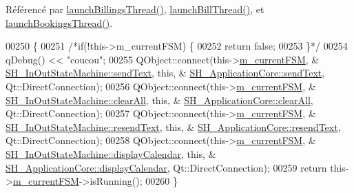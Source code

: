 Référencé par \hyperlink{classSH__ApplicationCore_a30738281acefd721fe9d06db46dcf123}{launch\-Billings\-Thread()}, \hyperlink{classSH__ApplicationCore_a17a048025bc51a96663029e58c722741}{launch\-Bill\-Thread()}, et \hyperlink{classSH__ApplicationCore_a193a9132da92b5e7a450e9307b657893}{launch\-Bookings\-Thread()}.


\begin{DoxyCode}
00250 \{
00251     \textcolor{comment}{/*if(!this->m\_currentFSM) \{}
00252 \textcolor{comment}{        return false;}
00253 \textcolor{comment}{    \}*/}
00254     qDebug() << \textcolor{stringliteral}{"coucou"};
00255     QObject::connect(this->\hyperlink{classSH__ApplicationCore_a1088f3ba13abb8b3989cc0c325524232}{m\_currentFSM}, &
      \hyperlink{classSH__InOutStateMachine_ae2cbbe3cd207158668dcb4838938c7ad}{SH\_InOutStateMachine::sendText}, \textcolor{keyword}{this}, &
      \hyperlink{classSH__ApplicationCore_ac70121669e6133e84b0b8266b09b9199}{SH\_ApplicationCore::sendText}, Qt::DirectConnection);
00256         QObject::connect(this->\hyperlink{classSH__ApplicationCore_a1088f3ba13abb8b3989cc0c325524232}{m\_currentFSM}, &
      \hyperlink{classSH__InOutStateMachine_ad722deb53285919796b04db5af6e51b4}{SH\_InOutStateMachine::clearAll}, \textcolor{keyword}{this}, &
      \hyperlink{classSH__ApplicationCore_a5f60ca485028cf56d9d56f7e80685f10}{SH\_ApplicationCore::clearAll}, Qt::DirectConnection);
00257         QObject::connect(this->\hyperlink{classSH__ApplicationCore_a1088f3ba13abb8b3989cc0c325524232}{m\_currentFSM}, &
      \hyperlink{classSH__InOutStateMachine_a526822c66b46aa0cd81ba4473fa5573f}{SH\_InOutStateMachine::resendText}, \textcolor{keyword}{this}, &
      \hyperlink{classSH__ApplicationCore_a5eb6c04758ff47330a8249da2b3265f2}{SH\_ApplicationCore::resendText}, Qt::DirectConnection);
00258     QObject::connect(this->\hyperlink{classSH__ApplicationCore_a1088f3ba13abb8b3989cc0c325524232}{m\_currentFSM}, &
      \hyperlink{classSH__InOutStateMachine_a0d241868828cbf9798233a8c74c69851}{SH\_InOutStateMachine::displayCalendar}, \textcolor{keyword}{this}, &
      \hyperlink{classSH__ApplicationCore_a7236456c901a089ca6e5735ec7e5da03}{SH\_ApplicationCore::displayCalendar}, Qt::DirectConnection);
00259     \textcolor{keywordflow}{return} this->\hyperlink{classSH__ApplicationCore_a1088f3ba13abb8b3989cc0c325524232}{m\_currentFSM}->isRunning();
00260 \}
\end{DoxyCode}


